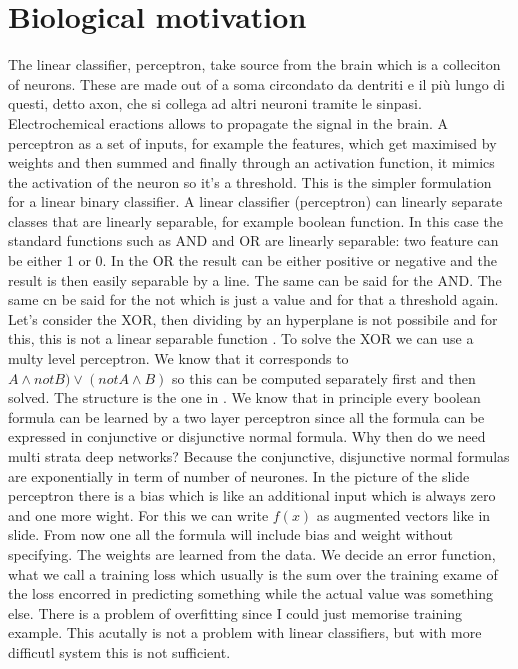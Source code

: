 \chapter{Biological motivation}
The linear classifier, perceptron, take source from the brain which is a colleciton of neurons. These are made out of a soma circondato da dentriti e il più lungo di questi, detto axon, che si collega ad altri neuroni tramite le sinpasi. \newline
Electrochemical eractions allows to propagate the signal in the brain. \newline
A perceptron as a set of inputs, for example the features, which get maximised by weights and then summed and finally through an activation function, it mimics the activation of the neuron so it's a threshold. This is the simpler formulation for a linear binary classifier.\newline
A linear classifier (perceptron) can linearly separate classes that are linearly separable, for example boolean function. In this case the standard functions such as AND and OR are linearly separable: two feature can be either 1 or 0. In the OR the result can be either positive or negative and the result is then easily separable by a line. The same can be said for the AND. The same cn be said for the not which is just a value and for that a threshold again. Let's consider the XOR, then dividing by an hyperplane is not possibile and for this, this is not a linear separable function . To solve the XOR we can use a multy level perceptron. We know that it corresponds to $A\wedge not B)\vee (not A\wedge B)$ so this can be computed separately first and then solved. The structure is the one in . We know that in principle every boolean formula can be learned by a two layer perceptron since all the formula can be expressed in conjunctive or disjunctive normal formula. Why then do we need multi strata deep networks? Because the conjunctive, disjunctive normal formulas are exponentially in term of number of neurones. \newline
In the picture of the slide perceptron there is a bias which is like an additional input which is always zero and one more wight. For this we can write $f(x)$ as augmented vectors like in slide. From now one all the formula will include bias and weight without specifying.\newline
The weights are learned from the data. We decide an error function, what we call a training loss which usually is the sum over the training exame of the loss encorred in predicting something while the actual value was something else. There is a problem of overfitting since I could just memorise training example. This acutally is not a problem with linear classifiers, but with more difficutl system this is not sufficient. \newline
